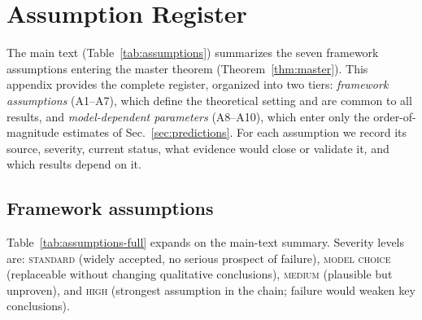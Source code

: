 
\section{Assumption Register}\label{app:assumptions}

The main text (Table~\ref{tab:assumptions}) summarizes the seven
framework assumptions entering the master theorem
(Theorem~\ref{thm:master}).  This appendix provides the complete
register, organized into two tiers: \emph{framework assumptions}
(A1--A7), which define the theoretical setting and are common to all
results, and \emph{model-dependent parameters} (A8--A10), which enter
only the order-of-magnitude estimates of
Sec.~\ref{sec:predictions}.  For each assumption we record its
source, severity, current status, what evidence would close or
validate it, and which results depend on it.

\subsection{Framework assumptions}\label{app:framework-assumptions}

Table~\ref{tab:assumptions-full} expands on the main-text summary.
Severity levels are: \textsc{standard} (widely accepted, no serious
prospect of failure), \textsc{model choice} (replaceable without
changing qualitative conclusions), \textsc{medium} (plausible but
unproven), and \textsc{high} (strongest assumption in the chain;
failure would weaken key conclusions).

